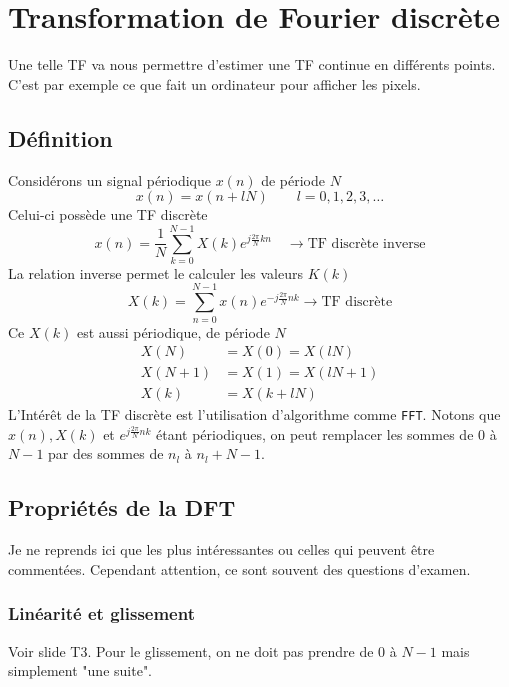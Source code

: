 \chapter{Transformation de Fourier discrète}
Une telle TF va nous permettre d'estimer une TF continue en différents points. C'est par 
exemple ce que fait un ordinateur pour afficher les pixels. 
\section{Définition}
Considérons un signal périodique $x(n)$ de période $N$
\begin{equation}
x(n) = x(n+lN)\qquad l =0,1,2,3,\dots
\end{equation}
Celui-ci possède une TF discrète
\begin{equation}
x(n) = \frac{1}{N}\sum_{k=0}^{N-1} X(k)e^{j\frac{2\pi}{N}kn}\quad\rightarrow\text{TF discrète inverse}
\end{equation}
La relation inverse permet le calculer les valeurs $K(k)$
\begin{equation}
X(k) = \sum_{n=0}^{N-1} x(n)e^{-j\frac{2\pi}{N}nk} \rightarrow\text{TF discrète}
\end{equation}
Ce $X(k)$ est aussi périodique, de période $N$
\begin{equation}
\begin{array}{lll}
X(N) &= X(0) = X(lN)\\
X(N+1) &= X(1) = X(lN+1)\\
X(k) &= X(k+lN)
\end{array}
\end{equation}
L’Intérêt de la TF discrète est l'utilisation d'algorithme comme \texttt{FFT}. Notons que 
$x(n), X(k)$ et $e^{j\frac{2\pi}{N}nk}$ étant périodiques, on peut remplacer les sommes de 
0 à $N-1$ par des sommes de $n_l$ à $n_l+N-1$.

\section{Propriétés de la DFT}
Je ne reprends ici que les plus intéressantes ou celles qui peuvent être commentées. Cependant 
attention, ce sont souvent des questions d'examen.

	\subsection{Linéarité et glissement}
	Voir slide T3. Pour le glissement, on ne doit pas prendre de 0 à $N-1$ mais simplement 
	"une suite". 
	
